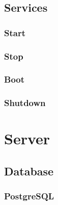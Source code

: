 \subsection{Services}
\label{subsec:implementation_installer_services}

\subsubsection{Start}
\label{subsubsec:implementation_installer_services_start}

\subsubsection{Stop}
\label{subsubsec:implementation_installer_services_stop}

\subsubsection{Boot}
\label{subsubsec:implementation_installer_services_boot}

\subsubsection{Shutdown}
\label{subsubsec:implementation_installer_services_shutdown}

\section{Server}
\label{sec:implementation_server}

\subsection{Database}
\label{subsec:implementation_server_database}

\subsubsection{PostgreSQL}
\label{subsubsec:implementation_server_database_postgresql}

